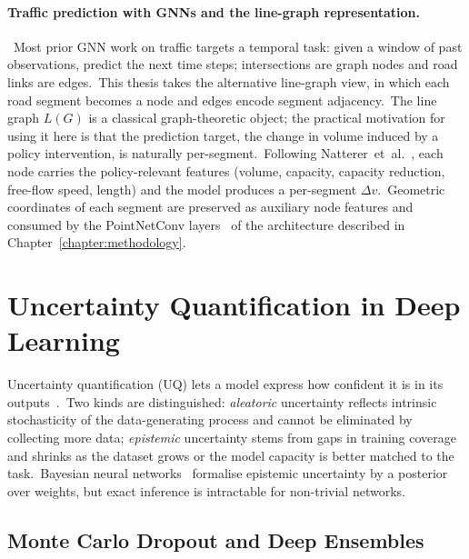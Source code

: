 \paragraph{Traffic prediction with GNNs and the line-graph representation.}\ Most prior GNN work on traffic targets a temporal task: given a window of past observations, predict the next time steps; intersections are graph nodes and road links are edges.\ This thesis takes the alternative line-graph view, in which each road segment becomes a node and edges encode segment adjacency.\ The line graph $L(G)$ is a classical graph-theoretic object; the practical motivation for using it here is that the prediction target, the change in volume induced by a policy intervention, is naturally per-segment.\ Following Natterer~et~al.~\cite{natterer2025ml}, each node carries the policy-relevant features (volume, capacity, capacity reduction, free-flow speed, length) and the model produces a per-segment $\Delta v$.\ Geometric coordinates of each segment are preserved as auxiliary node features and consumed by the PointNetConv layers~\cite{qi2017pointnet} of the architecture described in Chapter~\ref{chapter:methodology}.

\section{Uncertainty Quantification in Deep Learning}\label{sec:uq}

Uncertainty quantification (UQ) lets a model express how confident it is in its outputs~\cite{abdar2021review,gawlikowski2023survey}.\ Two kinds are distinguished: \emph{aleatoric} uncertainty reflects intrinsic stochasticity of the data-generating process and cannot be eliminated by collecting more data; \emph{epistemic} uncertainty stems from gaps in training coverage and shrinks as the dataset grows or the model capacity is better matched to the task.\ Bayesian neural networks~\cite{mackay1992practical} formalise epistemic uncertainty by a posterior over weights, but exact inference is intractable for non-trivial networks.

\subsection{Monte Carlo Dropout and Deep Ensembles}\label{sec:mc_dropout_bg}

